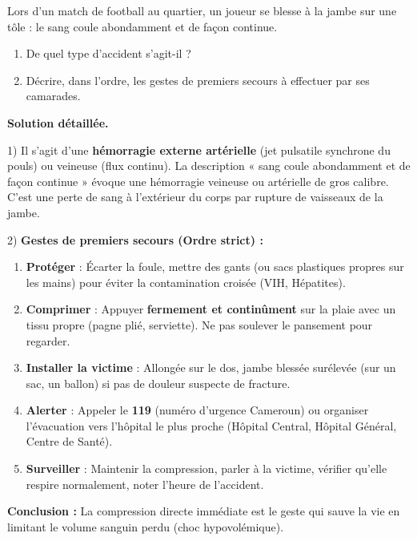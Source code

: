 \documentclass[11pt]{article}
\begin{document}
\begin{exoresolu}
Lors d'un match de football au quartier, un joueur se blesse à la jambe sur une tôle : le sang coule abondamment et de façon continue.
\begin{enumerate}
\item De quel type d'accident s'agit-il ?
\item Décrire, dans l'ordre, les gestes de premiers secours à effectuer par ses camarades.
\end{enumerate}
\tcblower
\textbf{Solution détaillée.}

1) Il s'agit d'une \textbf{hémorragie externe artérielle} (jet pulsatile synchrone du pouls) ou veineuse (flux continu). La description « sang coule abondamment et de façon continue » évoque une hémorragie veineuse ou artérielle de gros calibre. C'est une perte de sang à l'extérieur du corps par rupture de vaisseaux de la jambe.

2) \textbf{Gestes de premiers secours (Ordre strict) :}
\begin{enumerate}
\item \textbf{Protéger} : Écarter la foule, mettre des gants (ou sacs plastiques propres sur les mains) pour éviter la contamination croisée (VIH, Hépatites).
\item \textbf{Comprimer} : Appuyer \textbf{fermement et continûment} sur la plaie avec un tissu propre (pagne plié, serviette). Ne pas soulever le pansement pour regarder.
\item \textbf{Installer la victime} : Allongée sur le dos, jambe blessée surélevée (sur un sac, un ballon) si pas de douleur suspecte de fracture.
\item \textbf{Alerter} : Appeler le \textbf{119} (numéro d'urgence Cameroun) ou organiser l'évacuation vers l'hôpital le plus proche (Hôpital Central, Hôpital Général, Centre de Santé).
\item \textbf{Surveiller} : Maintenir la compression, parler à la victime, vérifier qu'elle respire normalement, noter l'heure de l'accident.
\end{enumerate}
\textbf{Conclusion :} La compression directe immédiate est le geste qui sauve la vie en limitant le volume sanguin perdu (choc hypovolémique).
\end{exoresolu}
\end{document}
